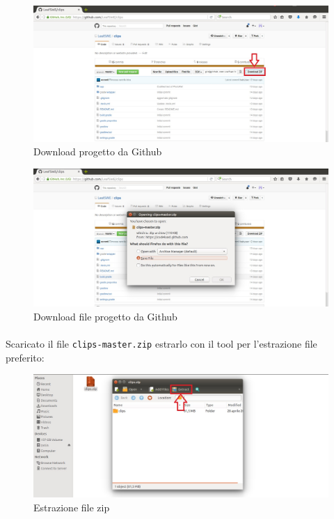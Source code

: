 \documentclass[../ManualeSviluppatore.tex]{subfiles}
\begin{document}
			\begin{figure} [h]
				\centering
				\includegraphics[scale=0.34]{img/DownloadZip}
				\caption{Download progetto da Github}
				\label{fig:DownloadZip}
			\end{figure}
			
			\begin{figure} [h]
				\centering
				\includegraphics[width=\textwidth]{img/Download}
				\caption{Download file progetto da Github}
				\label{fig:DownloadZip2}
			\end{figure}
			
		\paragraph*{}
			Scaricato il file \verb|clips-master.zip| estrarlo con il tool per l'estrazione file preferito:
			
			\begin{figure} [h]
				\centering
				\includegraphics[width=\textwidth]{img/EstraiZip}
				\caption{Estrazione file zip}
				\label{fig:EstraiZip}
			\end{figure}
			
\end{document}
